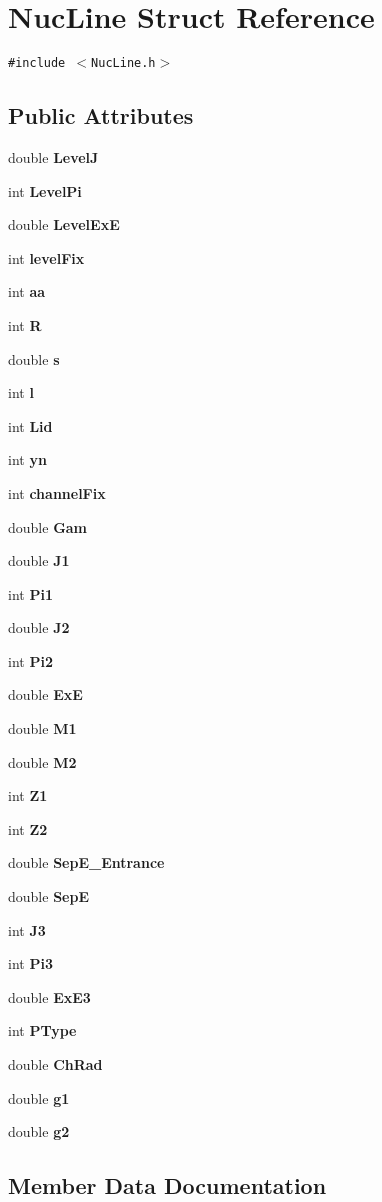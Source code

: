\section{Nuc\-Line Struct Reference}
\label{structNucLine}
{\tt \#include $<$Nuc\-Line.h$>$}

\subsection*{Public Attributes}
\begin{CompactItemize}
\item 
double \bf{Level\-J}
\item 
int \bf{Level\-Pi}
\item 
double \bf{Level\-Ex\-E}
\item 
int \bf{level\-Fix}
\item 
int \bf{aa}
\item 
int \bf{R}
\item 
double \bf{s}
\item 
int \bf{l}
\item 
int \bf{Lid}
\item 
int \bf{yn}
\item 
int \bf{channel\-Fix}
\item 
double \bf{Gam}
\item 
double \bf{J1}
\item 
int \bf{Pi1}
\item 
double \bf{J2}
\item 
int \bf{Pi2}
\item 
double \bf{Ex\-E}
\item 
double \bf{M1}
\item 
double \bf{M2}
\item 
int \bf{Z1}
\item 
int \bf{Z2}
\item 
double \bf{Sep\-E\_\-Entrance}
\item 
double \bf{Sep\-E}
\item 
int \bf{J3}
\item 
int \bf{Pi3}
\item 
double \bf{Ex\-E3}
\item 
int \bf{PType}
\item 
double \bf{Ch\-Rad}
\item 
double \bf{g1}
\item 
double \bf{g2}
\end{CompactItemize}


\subsection{Member Data Documentation}
